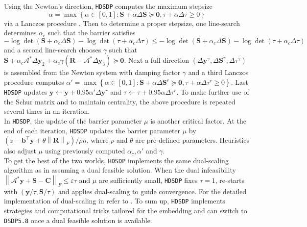 Using the Newton's direction, {{\texttt{HDSDP}}} computes the maximum stepsize
$$\alpha = \max \left\{ \alpha \in [0, 1] : \mathbf{S} + \alpha \Delta \mathbf{S} \succeq \textbf{0},
\tau + \alpha \Delta \tau \geq 0 \right\}$$ via a Lanczos procedure
{\cite{toh2002note}}. Then to determine a proper stepsize, one line-search
determines $\alpha_c$ such that the barrier satisfies $- \log \det \left( \mathbf{S}
+ \alpha_c \Delta \mathbf{S} \right) - \log \det (\tau + \alpha_c \Delta \tau) \leq -
\log \det \left( \mathbf{S} + \alpha_c \Delta \mathbf{S} \right) - \log \det (\tau +
\alpha_c \Delta \tau)$ and a second line-search chooses $\gamma$ such that $\mathbf{S}
+ \alpha_c \mathcal{A}^{\ast} \Delta \mathbf{y}_2 + \alpha_c \gamma \left( \mathbf{R}
-\mathcal{A}^{\ast} \Delta \mathbf{y}_3 \right) \succeq \textbf{0}$. Next a full direction
$\left( \Delta \mathbf{y}^{\gamma}, \Delta \mathbf{S}^{\gamma}, \Delta \tau^{\gamma} \right)$
is assembled from the Newton system with damping factor $\gamma$ and
a third Lanczos procedure computes  $\alpha' = \max \left\{ \alpha \in [0, 1] :
\mathbf{S} + \alpha \Delta \mathbf{S}^r \succeq \textbf{0}, \tau + \alpha \Delta \tau^r \geq 0
\right\}$. Last {{\texttt{HDSDP}}} updates $\mathbf{y} \leftarrow \mathbf{y} + 0.95 \alpha'
\Delta \mathbf{y}^r$ and $\tau \leftarrow \tau + 0.95 \alpha \Delta \tau^r$. To make
further use of the Schur matrix and to maintain centrality, the
above procedure is repeated several times in an iteration. \\

In {{\texttt{HDSDP}}}, the update of the barrier parameter $\mu$ is another
critical factor. At the end of each iteration, {{\texttt{HDSDP}}} updates the
barrier parameter $\mu$ by $\left( \bar{z} - \mathbf{b}^{\top} \mathbf{y} + \theta \left\|
\mathbf{R} \right\|_F \right) / \rho n$, where $\rho$ and $\theta$ are pre-defined
parameters. Heuristics also adjust $\mu$ using  previously computed $\alpha_c, \alpha'$ and $\gamma$. \\

To get the best of the two worlds, {{\texttt{HDSDP}}} implements the same
dual-scaling algorithm as in  assuming a dual feasible solution. 
When the dual infeasibility
$\left\| \mathcal{A}^{\ast} \mathbf{y} + \mathbf{S} - \mathbf{C} \right\|_F \leq \varepsilon \tau$ and $\mu$
are sufficiently small, {{\texttt{HDSDP}}} fixes $\tau = 1$, re-starts with
$\left( \mathbf{y} / \tau, \mathbf{S} / \tau \right)$ and applies dual-scaling to guide
convergence. For the detailed implementation of dual-scaling in
 refer to {\cite{benson2008algorithm}}. To sum up,
{{\texttt{HDSDP}}} implements strategies and computational tricks tailored for
the embedding and can switch to {{\texttt{DSDP5.8}}} once a dual feasible solution is available.
